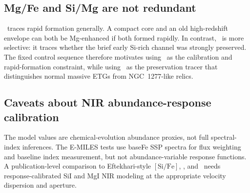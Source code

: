 \subsection{Mg/Fe and Si/Mg are not redundant}

\mgfe\ traces rapid formation generally. A compact core and an old high-redshift envelope can both be Mg-enhanced if both formed rapidly. In contrast, \simg\ is more selective: it traces whether the brief early Si-rich channel was strongly preserved. The fixed control sequence therefore motivates using \mgfe\ as the calibration and rapid-formation constraint, while using \simg\ as the preservation tracer that distinguishes normal massive ETGs from NGC~1277-like relics.

\subsection{Caveats about NIR abundance-response calibration}

The model values are chemical-evolution abundance proxies, not full spectral-index inferences. The E-MILES tests use baseFe SSP spectra for flux weighting and baseline index measurement, but not abundance-variable response functions. A publication-level comparison to Eftekhari-style $[\mathrm{Si}/\mathrm{Fe}]$, \mgfe, and \simg\ needs response-calibrated SiI and MgI NIR modeling at the appropriate velocity dispersion and aperture.
